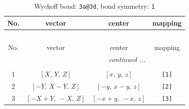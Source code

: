 \documentclass[fleqn,8pt]{jsarticle}
\begin{document}
\begin{longtable}{cccc}
\caption{Wyckoff bond: {\tt 3a@3d}, bond symmetry: {\tt 1}}
 \\
 \hline \hline
No. & vector & center & mapping \\ \hline \endfirsthead

\multicolumn{3}{l}{\tablename\ \thetable{}} \\
 \hline \hline
No. & vector & center & mapping \\ \hline \endhead

 \hline \hline
\multicolumn{3}{r}{\footnotesize\it continued ...} \\ \endfoot

 \hline \hline
\multicolumn{3}{r}{} \\ \endlastfoot

1 & $\left[ X,\, Y,\, Z \right]$ & $\left[ x,\, y,\, z \right]$ & {\tt [1]} \\ \hline
2 & $\left[ - Y,\, X - Y,\, Z \right]$ & $\left[ - y,\, x - y,\, z \right]$ & {\tt [2]} \\ \hline
3 & $\left[ - X + Y,\, - X,\, Z \right]$ & $\left[ - x + y,\, - x,\, z \right]$ & {\tt [3]} \\
\end{longtable}
\end{document}
